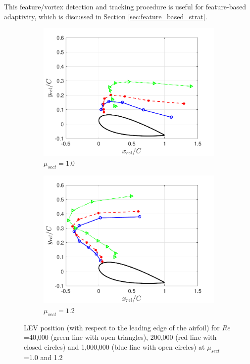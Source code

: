 This feature/vortex detection and tracking procedure is useful for feature-based adaptivity, which is discussed in Section \ref{sec:feature_based_strat}.


\begin{figure}[H]
	\begin{subfigure}{0.5\textwidth}
		\includegraphics[width=1\textwidth]{figures/LEV_location_lambda_1pt0}
		\caption{$\mu_{sect} = 1.0$}
		\label{fig:LEV_location_lambda_1p0}
	\end{subfigure}
	\begin{subfigure}{0.5\textwidth}
		\includegraphics[width=1\textwidth]{figures/LEV_location_lambda_1pt2}
		\caption{$\mu_{sect} = 1.2$}
		\label{fig:LEV_location_lambda_1p2}
	\end{subfigure}
 	\caption{LEV position (with respect to the leading edge of the airfoil) for $Re$=40,000 (green line with open triangles), 200,000 (red line with closed circles) and 1,000,000 (blue line with open circles) at $\mu_{sect}$=1.0 and 1.2}
	\label{fig:LEV_location_LE_airfoil}
\end{figure}



